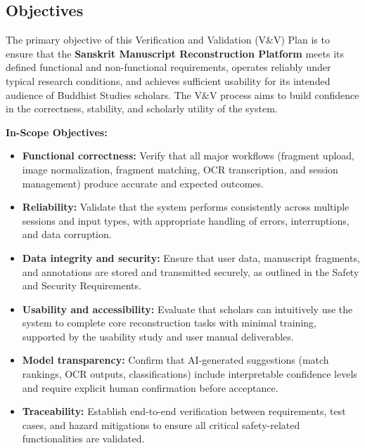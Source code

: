 \documentclass[12pt, titlepage]{article}
\begin{document}
\subsection{Objectives}

The primary objective of this Verification and Validation (V\&V) Plan is to ensure that the \textbf{Sanskrit Manuscript Reconstruction Platform} meets its defined functional and non-functional requirements, operates reliably under typical research conditions, and achieves sufficient usability for its intended audience of Buddhist Studies scholars. The V\&V process aims to build confidence in the correctness, stability, and scholarly utility of the system.

\textbf{In-Scope Objectives:}
\begin{itemize}
    \item \textbf{Functional correctness:} Verify that all major workflows (fragment upload, image normalization, fragment matching, OCR transcription, and session management) produce accurate and expected outcomes.
    \item \textbf{Reliability:} Validate that the system performs consistently across multiple sessions and input types, with appropriate handling of errors, interruptions, and data corruption.
    \item \textbf{Data integrity and security:} Ensure that user data, manuscript fragments, and annotations are stored and transmitted securely, as outlined in the Safety and Security Requirements.
    \item \textbf{Usability and accessibility:} Evaluate that scholars can intuitively use the system to complete core reconstruction tasks with minimal training, supported by the usability study and user manual deliverables.
    \item \textbf{Model transparency:} Confirm that AI-generated suggestions (match rankings, OCR outputs, classifications) include interpretable confidence levels and require explicit human confirmation before acceptance.
    \item \textbf{Traceability:} Establish end-to-end verification between requirements, test cases, and hazard mitigations to ensure all critical safety-related functionalities are validated.
\end{itemize}
\end{document}
